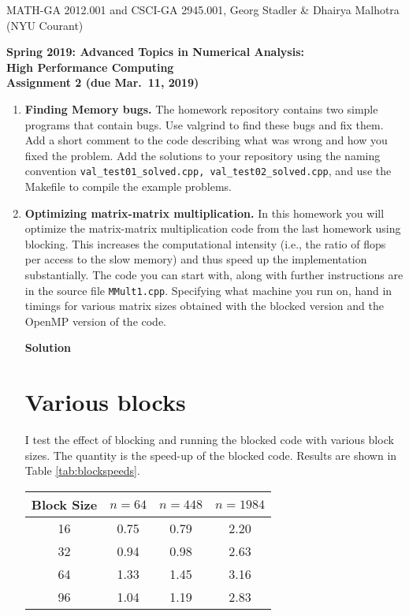 \documentclass[12pt]{article}
\begin{document}
\begin{center}
  \vspace*{-2cm}
{\small MATH-GA 2012.001 and CSCI-GA 2945.001, Georg Stadler \&
  Dhairya Malhotra (NYU Courant)}
\end{center}
\vspace*{.5cm}
\begin{center}
\large \textbf{%
Spring 2019: Advanced Topics in Numerical Analysis: \\
High Performance Computing \\
Assignment 2 (due Mar.\ 11, 2019) }
\end{center}



%
\begin{enumerate}
 \item {\bf Finding Memory bugs.}  The homework repository contains
   two simple programs that contain bugs. Use valgrind to find these
   bugs and fix them. Add a short comment to the code describing what
   was wrong and how you fixed the problem. Add the solutions to your
   repository using the naming convention
   \texttt{val\_test01\_solved.cpp, val\_test02\_solved.cpp}, and use
   the Makefile to compile the example problems.

  \item {\bf Optimizing matrix-matrix multiplication.} In this
    homework you will optimize the matrix-matrix multiplication code
    from the last homework using blocking. This increases the
    computational intensity (i.e., the ratio of flops per access to
    the slow memory) and thus speed up the implementation
    substantially. The code you can start with, along with further
    instructions are in the source file
    \texttt{MMult1.cpp}. Specifying what machine you run on, hand in
    timings for various matrix sizes obtained with the blocked version
    and the OpenMP version of the code.
    
    \textbf{Solution}
    
    \section{Various blocks}
    I test the effect of blocking and running the blocked code with various block sizes. The quantity is the speed-up of the blocked code. Results are shown in Table \ref{tab:blockspeeds}. 

\begin{table}[ht]
\centering
\begin{tabular}{c|c|c|c} 
Block Size & $n=64$ & $n=448$ & $n=1984$ \\[2 pt] \hline
16 & 0.75 & 0.79 & 2.20 \\[2 pt]
32 & 0.94 & 0.98 & 2.63 \\[2 pt]
64 & 1.33 & 1.45 & 3.16 \\[2 pt]
96 & 1.04 & 1.19 & 2.83 \\[2 pt]
\end{tabular}
\end{table}



\end{enumerate}
\end{document}
